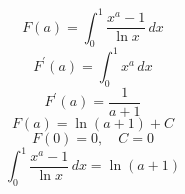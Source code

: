 \documentclass{article}
\begin{document}
\[
F(a)=\int_0^1\frac{x^a-1}{\ln x}\,dx
\]
\[
F^{\prime}(a)=\int_0^1x^a\,dx
\]
\[
F^{\prime}(a)=\frac{1}{a+1}
\]
\[
F(a)=\ln(a+1)+C
\]
\[
F(0)=0,\quad C=0
\]
\[
\int_0^1\frac{x^a-1}{\ln x}\,dx=\ln(a+1)
\]
\end{document}
